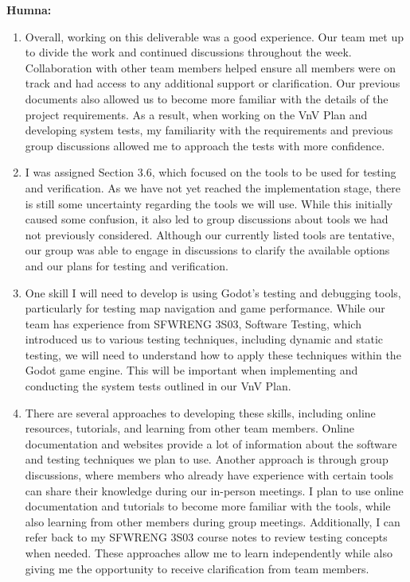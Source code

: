 \documentclass[12pt, titlepage]{article}
\begin{document}
\textbf{Humna:}
\begin{enumerate}
	\item Overall, working on this deliverable was a good experience. Our team met up
	to divide the work and continued discussions throughout the week.
	Collaboration with other team members helped ensure all members were
	on track and had access to any additional support or
	clarification. Our previous documents also allowed
	us to become more familiar with the details of the project
	requirements. As a result, when working on the VnV Plan and
	developing system tests, my familiarity with the requirements
	and previous group discussions allowed me to approach the tests
	with more confidence.
	\item I was assigned Section 3.6, which focused on the tools to be
	used for testing and verification. As we have not yet reached
	the implementation stage, there is still some uncertainty
	regarding the tools we will use. While this initially caused
	some confusion, it also led to group discussions about tools we had
	not previously considered. Although our currently listed tools
	are tentative, our group was able to engage in discussions
	to clarify the available options and our plans for testing
	and verification.
	\item One skill I will need to develop is using Godot's testing
	and debugging tools, particularly for testing map navigation
	and game performance. While our team has experience from
	SFWRENG 3S03, Software Testing, which introduced us to
	various testing techniques, including dynamic and static
	testing, we will need to understand how to apply these
	techniques within the Godot game engine. This will be important
	when implementing and conducting the system tests outlined
	in our VnV Plan.
	\item There are several approaches to developing these skills,
	including online resources, tutorials, and learning from
	other team members. Online documentation and websites provide
	a lot of information about the software and testing techniques
	we plan to use. Another approach is through group discussions,
	where members who already have experience with certain
	tools can share their knowledge during our in-person meetings.
	I plan to use online documentation and tutorials to become
	more familiar with the tools, while also learning from other
	members during group meetings. Additionally, I can refer
	back to my SFWRENG 3S03 course notes to review testing
	concepts when needed. These approaches allow me to learn independently while also
	giving me the opportunity to receive clarification from team members. 
\end{enumerate}
\end{document}
